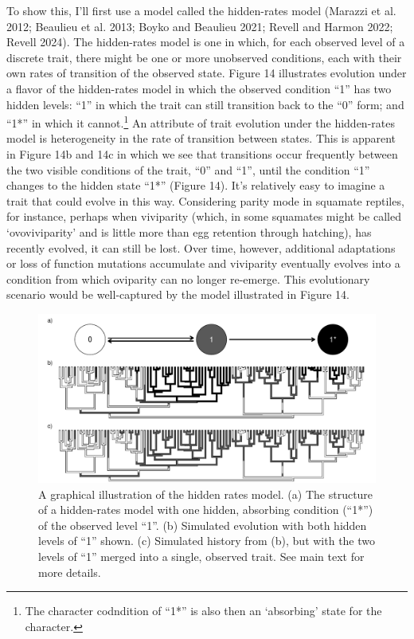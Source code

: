 \documentclass{article}
\begin{document}
To show this, I'll first use a model called the hidden-rates model (Marazzi et al. 2012; Beaulieu et al. 2013; Boyko and Beaulieu 2021; Revell and Harmon 2022; Revell 2024). The hidden-rates model is one in which, for each observed level of a discrete trait, there might be one or more unobserved conditions, each with their own rates of transition of the observed state. Figure 14 illustrates evolution under a flavor of the hidden-rates model in which the observed condition ``1'' has two hidden levels: ``1'' in which the trait can still transition back to the ``0'' form; and ``1*'' in which it cannot.\footnote{The character codndition of ``1*'' is also then an `absorbing' state for the character.} An attribute of trait evolution under the hidden-rates model is heterogeneity in the rate of transition between states. This is apparent in Figure 14b and 14c in which we see that transitions occur frequently between the two visible conditions of the trait, ``0'' and ``1'', until the condition ``1'' changes to the hidden state ``1*'' (Figure 14). It's relatively easy to imagine a trait that could evolve in this way. Considering parity mode in squamate reptiles, for instance, perhaps when viviparity (which, in some squamates might be called `ovoviviparity' and is little more than egg retention through hatching), has recently evolved, it can still be lost. Over time, however, additional adaptations or loss of function mutations accumulate and viviparity eventually evolves into a condition from which oviparity can no longer re-emerge. This evolutionary scenario would be well-captured by the model illustrated in Figure 14.

\begin{figure}
\includegraphics[width=1\linewidth]{Revell.AncestralReconstruction_files/figure-latex/fig14-1} \caption{A graphical illustration of the hidden rates model. (a) The structure of a hidden-rates model with one hidden, absorbing condition (``1*'') of the observed level ``1''. (b) Simulated evolution with both hidden levels of ``1'' shown. (c) Simulated history from (b), but with the two levels of ``1'' merged into a single, observed trait. See main text for more details.}\label{fig:fig14}
\end{figure}
\end{document}

